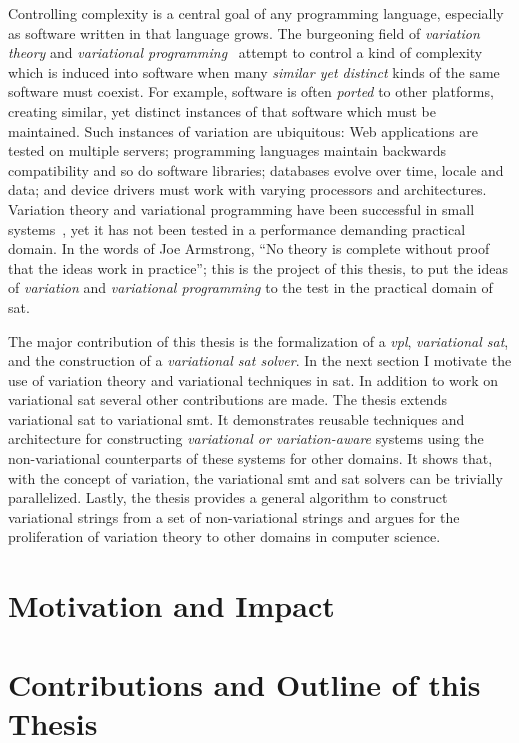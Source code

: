 \label{chapter:introduction}%
%
Controlling complexity is a central goal of any programming language, especially
as software written in that language grows. The burgeoning field of
\emph{variation theory} and \emph{variational
  programming}~\cite{EW11gttse,EW11tosem,HW16fosd,CEW16ecoop,Walk14onward}
attempt to control a kind of complexity which is induced into software when many
\emph{similar yet distinct} kinds of the same software must coexist. For
example, software is often \emph{ported} to other platforms, creating similar,
yet distinct instances of that software which must be maintained. Such instances
of variation are ubiquitous: Web applications are tested on multiple servers;
programming languages maintain backwards compatibility and so do software
libraries; databases evolve over time, locale and data; and device drivers must
work with varying processors and architectures. Variation theory and variational
programming have been successful in small
systems~\cite{ES18diagrams,SE17fosd,MMWWK17vamos}, yet it has not been tested in
a performance demanding practical domain. In the words of Joe
Armstrong\cite{armstrongThesis}, ``No theory is complete without proof that the
ideas work in practice''; this is the project of this thesis, to put the ideas
of \emph{variation} and \emph{variational programming} to the test in the
practical domain of \ac{sat}.

The major contribution of this thesis is the formalization of a
\emph{\ac{vpl}},
\emph{variational \acl{sat}}, and the construction of a \emph{variational
  \ac{sat} solver}. In the next section I motivate the use of variation theory
and variational techniques in \acl{sat}. In addition to work on variational
\ac{sat} several other contributions are made. The thesis extends variational
\acl{sat} to variational \ac{smt}. It demonstrates reusable techniques and
architecture for constructing \emph{variational or variation-aware} systems
using the non-variational counterparts of these systems for other domains. It
shows that, with the concept of variation, the variational \ac{smt} and \ac{sat}
solvers can be trivially parallelized. Lastly, the thesis provides a general
algorithm to construct variational strings from a set of non-variational strings
and argues for the proliferation of variation theory to other domains in
computer science.

\section{Motivation and Impact}


\section{Contributions and Outline of this Thesis}


